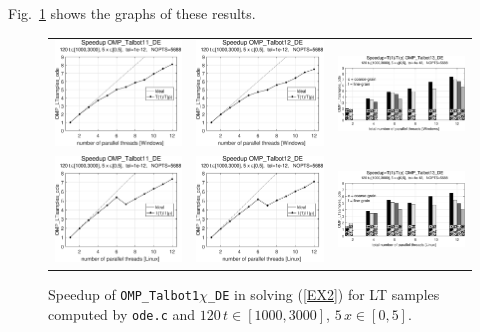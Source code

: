 \documentclass[a4paper,10pt]{report}%
\begin{document}
Fig.~\ref{PAR_EX2_speedup_ode} shows the graphs of these results.
\begin{figure}[htb]
\centering
\begin{tabular}{ccc} %
\includegraphics[height=0.2\textwidth]{./FIGS/EX2/EX2_ode_speedup_11_Windows.eps} &
\includegraphics[height=0.2\textwidth]{./FIGS/EX2/EX2_ode_speedup_12_Windows.eps} &
\includegraphics[height=0.2\textwidth,keepaspectratio=true]{./FIGS/EX2/EX2_ode_speedup_13_Windows.eps} \\
\includegraphics[height=0.2\textwidth]{./FIGS/EX2/EX2_ode_speedup_11_Linux.eps} &
\includegraphics[height=0.2\textwidth]{./FIGS/EX2/EX2_ode_speedup_12_Linux.eps} &
\includegraphics[height=0.2\textwidth,keepaspectratio=true]{./FIGS/EX2/EX2_ode_speedup_13_Linux.eps}
\end{tabular}
\caption{\small Speedup of {\tt OMP\_Talbot1$\chi$\_DE} in solving (\ref{EX2}) for LT samples computed
by {\tt ode.c} and $120\,t\in[1000,3000]$, $5\,x\in[0,5]$.}
\label{PAR_EX2_speedup_ode}
\end{figure}
\end{document}
